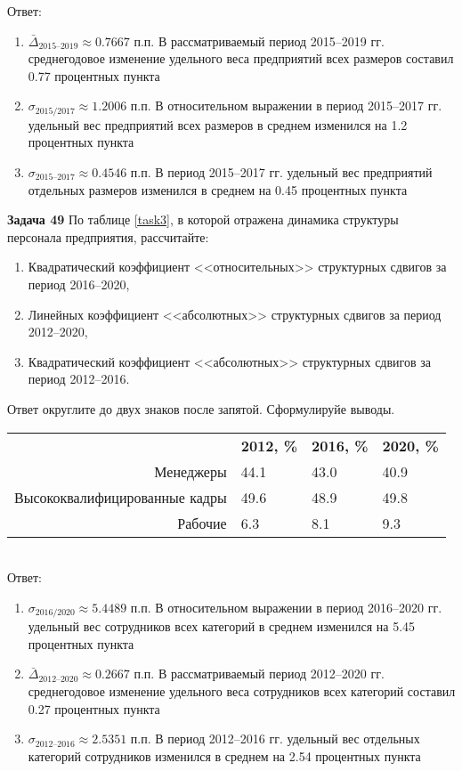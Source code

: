 \documentclass{article}
\begin{document}
Ответ: \begin{enumerate} \item $\bar\Delta_\text{2015--2019}\approx 0.7667$ п.п. В рассматриваемый период 2015--2019 гг. среднегодовое изменение удельного веса предприятий всех размеров составил 0.77 процентных пункта
\item $\sigma_\text{2015/2017}\approx 1.2006$ п.п. В относительном выражении в период 2015--2017 гг. удельный вес предприятий всех размеров в среднем изменился на 1.2 процентных пункта\item $\sigma_\text{2015--2017}\approx 0.4546$ п.п. В период 2015--2017 гг. удельный вес предприятий отдельных размеров изменился в среднем на 0.45 процентных пункта\end{enumerate}

\textbf{Задача 49} По таблице \ref{task3}, в которой отражена динамика структуры персонала предприятия, рассчитайте:
\begin{enumerate}[leftmargin=40pt]
\item Квадратический коэффициент <<относительных>> структурных сдвигов за период 2016--2020,
\item Линейных коэффициент <<абсолютных>> структурных сдвигов за период 2012--2020,
\item Квадратический коэффициент <<абсолютных>> структурных сдвигов за период 2012--2016.\medskip
\end{enumerate}

Ответ округлите до двух знаков после запятой. Сформулируйе выводы.\\

\begin{minipage}{\textwidth}
\centering
\begin{tabularx}{0.8\textwidth}{rYYY}
\toprule
 & \textbf{2012, \%} & \textbf{2016, \%} & \textbf{2020, \%} \\
\cmidrule(lr){2-2}\cmidrule(lr){3-3}\cmidrule(lr){4-4}
Менеджеры & 44.1 & 43.0 & 40.9 \\

Высококвалифицированные кадры & 49.6 & 48.9 & 49.8 \\

Рабочие & 6.3 & 8.1 & 9.3 \\
\bottomrule
\end{tabularx}
\label{task49}
\end{minipage} \\[35pt]

Ответ: \begin{enumerate} \item $\sigma_\text{2016/2020}\approx 5.4489$ п.п. В относительном выражении в период 2016--2020 гг. удельный вес сотрудников всех категорий в среднем изменился на 5.45 процентных пункта
\item $\bar\Delta_\text{2012--2020}\approx 0.2667$ п.п. В рассматриваемый период 2012--2020 гг. среднегодовое изменение удельного веса сотрудников всех категорий составил 0.27 процентных пункта\item $\sigma_\text{2012--2016}\approx 2.5351$ п.п. В период 2012--2016 гг. удельный вес отдельных категорий сотрудников изменился в среднем на 2.54 процентных пункта\end{enumerate}
\end{document}
